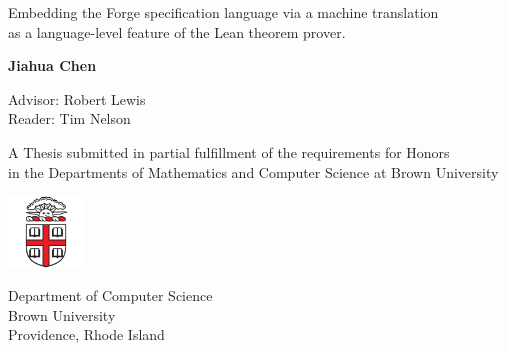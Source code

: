 
\begin{titlepage}
    \begin{center}
        \vspace*{1cm}
 
        \textbf{\thetitle}
 
        \vspace{0.5cm}
        Embedding the Forge specification language via a machine translation \\
        as a language-level feature of the Lean theorem prover. 
        \vspace{1.5cm}
 
        \textbf{Jiahua Chen}

        \vspace{1.5em}
        Advisor: Robert Lewis \\
        Reader: Tim Nelson
 
        \vfill
             
        A Thesis submitted in partial fulfillment of the requirements for Honors \\
        in the Departments of Mathematics and Computer Science at Brown University
             
        \vspace{3em}
      
        \includegraphics[width=0.15\textwidth]{images/brown-logo.png}
        \vspace{1em}
             
        Department of Computer Science\\
        Brown University\\
        Providence, Rhode Island\\
        \thedate
    \end{center}
 \end{titlepage}
 